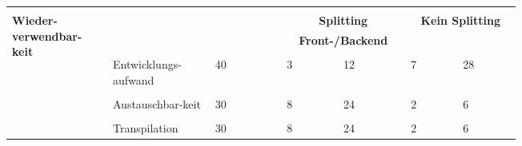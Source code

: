 \documentclass[main.tex]{subfiles} %
\begin{document}
\begin{table}[ht]
\begin{tabular}{|p{0.14\linewidth}|p{0.15\linewidth}|p{0.115\linewidth}|p{0.08\linewidth}|p{0.09\linewidth}|p{0.08\linewidth}|p{0.09\linewidth}|}
        \hline
        \hline
                                                           & \multicolumn{2}{c|}{}               & \multicolumn{2}{c|}{}                        & \multicolumn{2}{c|}{}                                                                   \\[-9pt]
        \multirow{6}{4em}{\textbf{Wieder-verwendbar-keit}} & \multicolumn{2}{c|}{}               & \multicolumn{2}{c|}{\textbf{Splitting}}      & \multicolumn{2}{c|}{\textbf{Kein Splitting}}                                            \\[1pt]
                                                           & \multicolumn{2}{c|}{}               & \multicolumn{2}{c|}{\textbf{Front-/Backend}} & \multicolumn{2}{c|}{\textbf{}}                                                          \\[1pt]
        \cline{2-7}
                                                           &                                     &                                              &                                                &             &            &             \\[-9pt]
                                                           & Entwicklungs-aufwand                & 40                                           & 3                                              & 12          & 7          & 28          \\[1pt]
        \cline{2-7}
                                                           &                                     &                                              &                                                &             &            &             \\[-9pt]
                                                           & Austauschbar-keit                   & 30                                           & 8                                              & 24          & 2          & 6           \\[1pt]
        \cline{2-7}
                                                           &                                     &                                              &                                                &             &            &             \\[-9pt]
                                                           & Transpilation                       & 30                                           & 8                                              & 24          & 2          & 6           \\[1pt]

\end{tabular}
\end{table}
\end{document}
